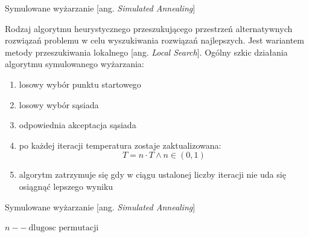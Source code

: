 \begin{frame}{Symulowane wyżarzanie [ang. \textit{Simulated Annealing}]}

	\begin{block}{}
	Rodzaj algorytmu heurystycznego przeszukującego przestrzeń alternatywnych rozwiązań problemu w celu wyszukiwania rozwiązań najlepszych. Jest wariantem metody przeszukiwania lokalnego [ang. \textit{Local Search}].
	Ogólny szkic działania algorytmu symulowanego wyżarzania:
	\end{block}
	\begin{enumerate}
		\item losowy wybór punktu startowego
		\item losowy wybór sąsiada
		\item odpowiednia akceptacja sąsiada
		\item po każdej iteracji temperatura zostaje zaktualizowana:
			$$ T = n\cdot T \wedge n \in (0,1)$$
		\item algorytm zatrzymuje się gdy w ciągu ustalonej liczby iteracji nie uda się osiągnąć lepszego wyniku
	\end{enumerate}

\end{frame}

\begin{frame}{Symulowane wyżarzanie [ang. \textit{Simulated Annealing}]}

    \begin{algorithmic}[H]
    \State $n -- \ \text{dlugosc permutacji}$
    \end{algorithmic}

\end{frame}

